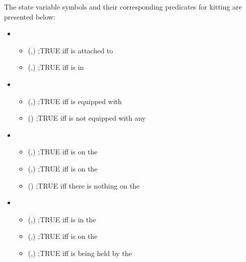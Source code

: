 The state variable symbols and their corresponding predicates for kitting are presented below:
\begin{itemize}
 \item {}
  \begin{itemize}
  \item {}(,) ;TRUE iff  is attached to 
  \item {}(,) ;TRUE iff  is in 
  \end{itemize}

 \item {}
  \begin{itemize}
  \item {}(,) ;TRUE iff  is equipped with 
  \item {}() ;TRUE iff  is not equipped with any 	
  \end{itemize}

 \item {}
  \begin{itemize}
  \item {}(,) ;TRUE iff  is on the 
  \item {}(,) ;TRUE iff  is on the 
  \item {}() ;TRUE iff there is nothing on the 
  \end{itemize}

 \item {}
  \begin{itemize}
  \item {}(,) ;TRUE iff  is in the 
  \item {}(,) ;TRUE iff  is on the 
  \item {}(,) ;TRUE iff  is being held by the 	
  \end{itemize}


\end{itemize}
